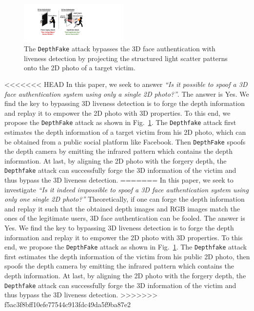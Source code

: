 \begin{figure}[t]
	\centerline{\includegraphics[width = 0.48\textwidth]{figures/intro.pdf}}
	\vspace{-0.1in}
	\caption{The \texttt{DepthFake} attack bypasses the 3D face authentication with liveness detection by projecting the structured light scatter patterns onto the 2D photo of a target victim.}
	\label{intro}
	\vspace{-0.2in}
\end{figure}

<<<<<<< HEAD
In this paper, we seek to answer \emph{``Is it possible to spoof a 3D face authentication system using only a single 2D photo?''}.
The answer is Yes. We find the key to bypassing 3D liveness detection is to forge the depth information and replay it to empower the 2D photo with 3D properties. To this end, we propose the \texttt{DepthFake} attack as shown in Fig.~\ref{intro}. The \texttt{Depthfake} attack first estimates the depth information of a target victim from his 2D photo, which can be obtained from a public social platform like Facebook. Then \texttt{DepthFake} spoofs the depth camera by emitting the infrared pattern which contains the depth information. At last, by aligning the 2D photo with the forgery depth, the \texttt{Depthfake} attack can successfully forge the 3D information of the victim and thus bypass the 3D liveness detection.
=======
In this paper, we seek to investigate \emph{``Is it indeed impossible to spoof a 3D face authentication system using only one single 2D photo?''} Theoretically, if one can forge the depth information and replay it such that the obtained depth images and RGB images match the ones of the legitimate users, 3D face authentication can be fooled. %
The answer is Yes. We find the key to bypassing 3D liveness detection is to forge the depth information and replay it to empower the 2D photo with 3D properties. To this end, we propose the \texttt{DepthFake} attack as shown in Fig.~\ref{intro}. The \texttt{Depthfake} attack first estimates the depth information of the victim from his public 2D photo, then spoofs the depth camera by emitting the infrared pattern which contains the depth information. At last, by aligning the 2D photo with the forgery depth, the \texttt{Depthfake} attack can successfully forge the 3D information of the victim and thus bypass the 3D liveness detection.
>>>>>>> f5ac3f8bff10efe77544c913fdc49da5f9ba87e2


